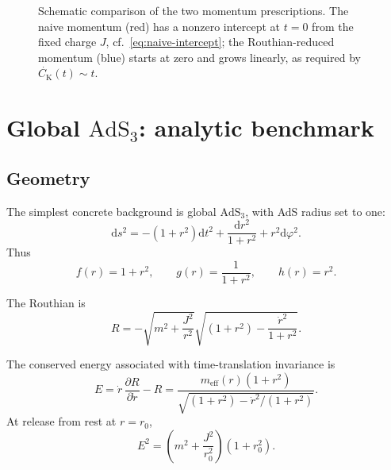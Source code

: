 \documentclass[11pt,a4paper]{article}
\theoremstyle{plain}
\theoremstyle{definition}
\theoremstyle{remark}
\newcommand{\PrR}{P_r^{(R)}}
\newcommand{\Ck}{C_{\mathrm K}}
\newcommand{\meff}{m_{\mathrm{eff}}}
\begin{document}
\begin{figure}[ht]
\centering
{}
\caption{Schematic comparison of the two momentum prescriptions. The naive momentum (red) has a nonzero intercept at $t=0$ from the fixed charge $J$, cf.\ \eqref{eq:naive-intercept}; the Routhian-reduced momentum (blue) starts at zero and grows linearly, as required by $\dot{\Ck}(t)\sim t$.}
\label{fig:naive-vs-routhian-schematic}
\end{figure}

\section{\texorpdfstring{Global $\mathrm{AdS}_3$}{Global AdS3}: analytic benchmark}
\label{sec:ads3}

\subsection{Geometry}

The simplest concrete background is global $\mathrm{AdS}_3$, with AdS radius set to one:
\begin{equation*}
\mathrm d s^2
=
-(1+r^2)\mathrm d t^2
+
\frac{\mathrm d r^2}{1+r^2}
+
r^2\mathrm d\varphi^2 .
\end{equation*}
Thus
\begin{equation*}
f(r)=1+r^2,
\qquad
g(r)=\frac1{1+r^2},
\qquad
h(r)=r^2.
\end{equation*}

The Routhian is
\begin{equation}
R
=
-\sqrt{
m^2+\frac{J^2}{r^2}
}
\sqrt{
(1+r^2)-\frac{\dot r^2}{1+r^2}
}.
\label{eq:ads3-routhian}
\end{equation}

The conserved energy associated with time-translation invariance is
\begin{equation}
E
=
\dot r\,\frac{\partial R}{\partial\dot r}-R
=
\frac{
\meff(r)(1+r^2)
}{
\sqrt{(1+r^2)-\dot r^2/(1+r^2)}
}.
\label{eq:ads3-energy}
\end{equation}
At release from rest at $r=r_0$,
\begin{equation}
E^2
=
\left(m^2+\frac{J^2}{r_0^2}\right)(1+r_0^2).
\label{eq:ads3-energy-initial}
\end{equation}
\end{document}
